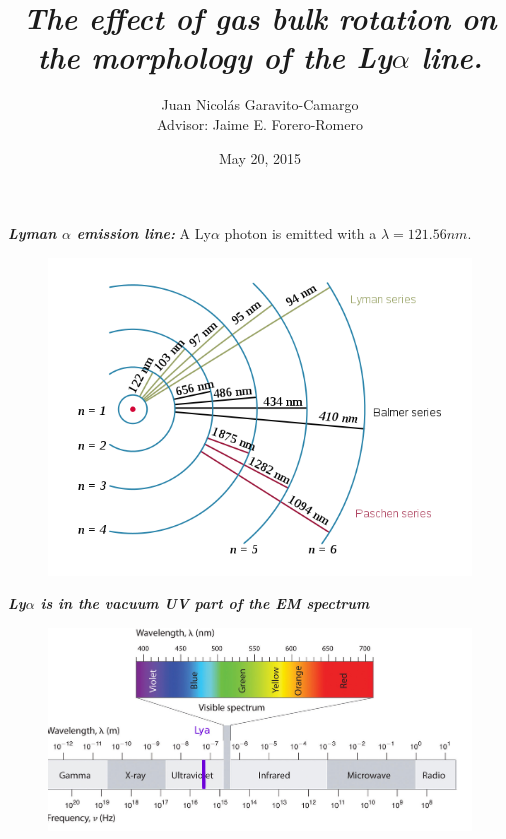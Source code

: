 \documentclass{beamer}
\title{\textit{\textbf{The effect of gas bulk rotation on the morphology of the Ly$\alpha$ line.}}}
\author{Juan Nicol\'as Garavito-Camargo \\ Advisor: Jaime E. Forero-Romero}
\institute{Universidad de los Andes, Bogot\'a, Colombia}
\date{May 20, 2015}
\begin{document}


\begin{frame}{\textit{\textbf{Lyman $\alpha$ emission line:}}}
A Ly$\alpha$ photon is emitted with a $\lambda= 121.56 nm$.
\begin{figure}
\includegraphics[scale=0.4]{Figures/Hydrogen_transitions.png}
\end{figure}
\end{frame}

\begin{frame}{\textit{\textbf{Ly$\alpha$ is in the vacuum UV part of the EM spectrum}}}
\begin{figure}
\centering
\includegraphics[scale=0.18]{Figures/em.jpg}
\end{figure}
\end{frame}
\end{document}
